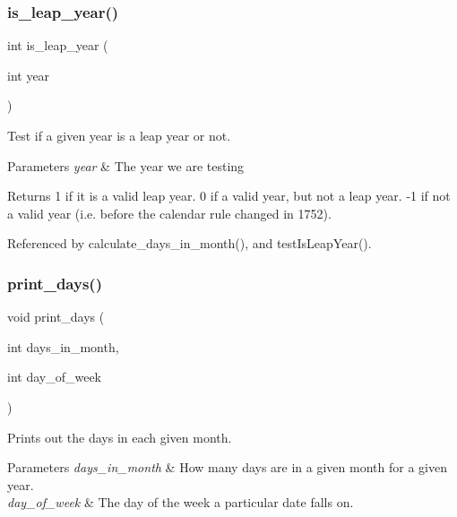 \mbox{\label{production_8c_a89b1fdc34c29bc50b397019f5e32f7af}} 
\subsubsection{is\+\_\+leap\+\_\+year()}
{\footnotesize\ttfamily int is\+\_\+leap\+\_\+year (\begin{DoxyParamCaption}\item[{int}]{year }\end{DoxyParamCaption})}

Test if a given year is a leap year or not. 
\begin{DoxyParams}{Parameters}
{\em year} & The year we are testing \\
\hline
\end{DoxyParams}
\begin{DoxyReturn}{Returns}
1 if it is a valid leap year. 0 if a valid year, but not a leap year. -\/1 if not a valid year (i.\+e. before the calendar rule changed in 1752). 
\end{DoxyReturn}


Referenced by calculate\+\_\+days\+\_\+in\+\_\+month(), and test\+Is\+Leap\+Year().

\mbox{\label{production_8c_a52a2bceec80c444cd275fdaac71f01f3}} 
\subsubsection{print\+\_\+days()}
{\footnotesize\ttfamily void print\+\_\+days (\begin{DoxyParamCaption}\item[{int}]{days\+\_\+in\+\_\+month,  }\item[{int}]{day\+\_\+of\+\_\+week }\end{DoxyParamCaption})}

Prints out the days in each given month. 
\begin{DoxyParams}{Parameters}
{\em days\+\_\+in\+\_\+month} & How many days are in a given month for a given year. \\
\hline
{\em day\+\_\+of\+\_\+week} & The day of the week a particular date falls on. \\
\hline
\end{DoxyParams}


